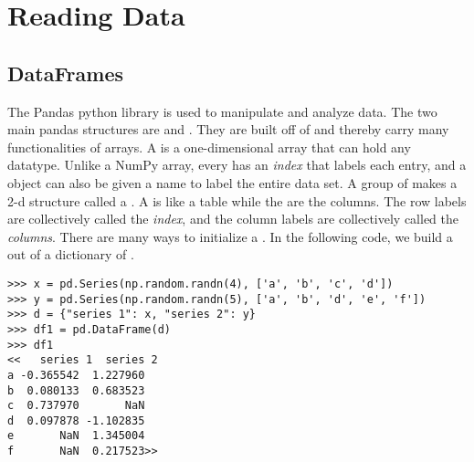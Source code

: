 \label{lab:pandas1}



\section*{Reading Data}

\subsection*{DataFrames}

The Pandas python library is used to manipulate and analyze data.
The two main pandas structures are  and .
They are built off of  and thereby carry many functionalities of arrays.
A  is a one-dimensional array that can hold any datatype.
Unlike a NumPy array, every  has an \emph{index} that labels each entry, and a  object can also be given a name to label the entire data set.
A group of  makes a 2-d structure called a .
A  is like a table while the  are the columns.
The row labels are collectively called the \emph{index}, and the column labels are collectively called the \emph{columns}.
There are many ways to initialize a .
In the following code, we build a  out of a dictionary of .

\begin{lstlisting}
>>> x = pd.Series(np.random.randn(4), ['a', 'b', 'c', 'd'])
>>> y = pd.Series(np.random.randn(5), ['a', 'b', 'd', 'e', 'f'])
>>> d = {"series 1": x, "series 2": y}
>>> df1 = pd.DataFrame(d)
>>> df1
<<   series 1  series 2
a -0.365542  1.227960
b  0.080133  0.683523
c  0.737970       NaN
d  0.097878 -1.102835
e       NaN  1.345004
f       NaN  0.217523>>
\end{lstlisting}

